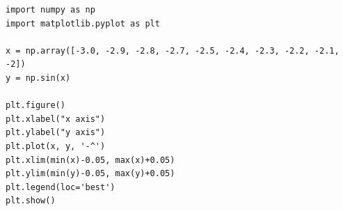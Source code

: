 \documentclass[12pt,a4paper]{article}
\begin{document}
\begin{minipage}{1\linewidth}
\small{
\begin{lstlisting}
import numpy as np
import matplotlib.pyplot as plt

x = np.array([-3.0, -2.9, -2.8, -2.7, -2.5, -2.4, -2.3, -2.2, -2.1, -2])
y = np.sin(x)

plt.figure()
plt.xlabel("x axis")
plt.ylabel("y axis")
plt.plot(x, y, '-^')
plt.xlim(min(x)-0.05, max(x)+0.05)
plt.ylim(min(y)-0.05, max(y)+0.05)
plt.legend(loc='best')
plt.show()
\end{lstlisting}
}
\end{minipage}
\end{document}

